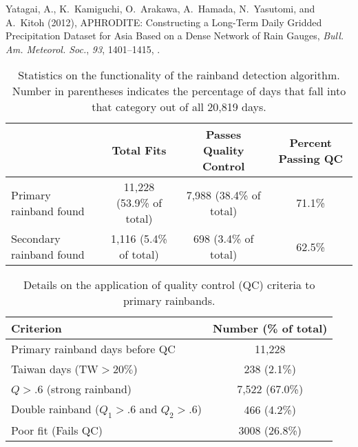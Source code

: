 \documentclass[draft,grl]{agutexSI}
\begin{document}
\begin{article}
\begin{thebibliography}{4}
Yatagai, A., K.~Kamiguchi, O.~Arakawa, A.~Hamada, N.~Yasutomi, and A.~Kitoh
  (2012), {APHRODITE: Constructing a Long-Term Daily Gridded Precipitation
  Dataset for Asia Based on a Dense Network of Rain Gauges}, \textit{Bull. Am.
  Meteorol. Soc.}, \textit{93}, 1401--1415, .

\end{thebibliography}

\end{article}

\clearpage


\begin{table}

\caption{Statistics on the functionality of the rainband detection algorithm. Number in parentheses indicates the percentage of days that fall into that category out of all 20,819 days.}
\centering

\begin{tabular}{ l c c c}
	  & Total Fits & Passes Quality Control & Percent Passing QC\\
	 \hline
	 Primary rainband found & 11,228 (53.9\% of total) & 7,988 (38.4\% of total) & 71.1\% \\
	 Secondary rainband found & 1,116 (5.4\% of total) & 698 (3.4\% of total) & 62.5\% \\
\end{tabular}
\label{ts1}
\end{table}

\begin{table}

\caption{Details on the application of quality control (QC) criteria to primary rainbands.}
\centering

\begin{tabular}{ l c}
	 Criterion & Number (\% of total) \\
	 \hline
	 Primary rainband days before QC & 11,228 \\
	 Taiwan days (TW$>20\%$) & 238 (2.1\%) \\
	 $Q>.6$ (strong rainband) & 7,522 (67.0\%) \\
	 Double rainband ($Q_1>.6$ and $Q_2>.6$) & 466 (4.2\%) \\
	 Poor fit (Fails QC) & 3008 (26.8\%) \\
	 
\end{tabular}
\label{ts2}
\end{table}
\end{document}
